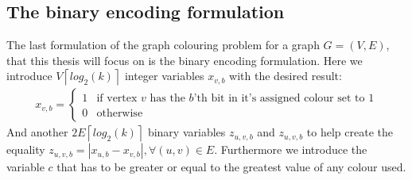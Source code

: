\subsection{The binary encoding formulation}
The last formulation of the graph colouring problem for a graph $G=(V,E)$, that this thesis will focus on is the binary encoding formulation. Here we introduce $V\left \lceil{log_2(k)}\right \rceil $ integer variables $x_{v,b}$ with the desired result:
\begin{align}\label{binX}
x_{v,b} =\left\{
\begin{array}{ll}
1 & \text{if vertex }v \text{ has the $b$'th bit in it's assigned colour set to 1} \\ 0 & \text{otherwise}
\end{array}\right.
\end{align} 
And another $2E\left \lceil{log_2(k)}\right \rceil$ binary variables $z_{u,v,b}$ and $z_{u,v,b}$ to help create the equality $z_{u,v,b} = |x_{u,b}-x_{v,b}|, \forall (u,v) \in E$.
Furthermore we introduce the variable $c$ that has to be greater or equal to the greatest value of any colour used.
